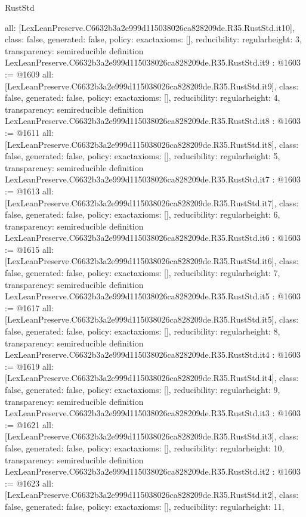 \begin{lexlean}{RustStd}
\begin{coremodule}
{  all: [LexLeanPreserve.C6632b3a2e999d115038026ca828209de.R35.RustStd.it10],
  class: false,
  generated: false,
  policy: exact{axioms: []},
  reducibility: regular{height: 3},
  transparency: semireducible
}
definition LexLeanPreserve.C6632b3a2e999d115038026ca828209de.R35.RustStd.it9 : @1603 := @1609 {
  all: [LexLeanPreserve.C6632b3a2e999d115038026ca828209de.R35.RustStd.it9],
  class: false,
  generated: false,
  policy: exact{axioms: []},
  reducibility: regular{height: 4},
  transparency: semireducible
}
definition LexLeanPreserve.C6632b3a2e999d115038026ca828209de.R35.RustStd.it8 : @1603 := @1611 {
  all: [LexLeanPreserve.C6632b3a2e999d115038026ca828209de.R35.RustStd.it8],
  class: false,
  generated: false,
  policy: exact{axioms: []},
  reducibility: regular{height: 5},
  transparency: semireducible
}
definition LexLeanPreserve.C6632b3a2e999d115038026ca828209de.R35.RustStd.it7 : @1603 := @1613 {
  all: [LexLeanPreserve.C6632b3a2e999d115038026ca828209de.R35.RustStd.it7],
  class: false,
  generated: false,
  policy: exact{axioms: []},
  reducibility: regular{height: 6},
  transparency: semireducible
}
definition LexLeanPreserve.C6632b3a2e999d115038026ca828209de.R35.RustStd.it6 : @1603 := @1615 {
  all: [LexLeanPreserve.C6632b3a2e999d115038026ca828209de.R35.RustStd.it6],
  class: false,
  generated: false,
  policy: exact{axioms: []},
  reducibility: regular{height: 7},
  transparency: semireducible
}
definition LexLeanPreserve.C6632b3a2e999d115038026ca828209de.R35.RustStd.it5 : @1603 := @1617 {
  all: [LexLeanPreserve.C6632b3a2e999d115038026ca828209de.R35.RustStd.it5],
  class: false,
  generated: false,
  policy: exact{axioms: []},
  reducibility: regular{height: 8},
  transparency: semireducible
}
definition LexLeanPreserve.C6632b3a2e999d115038026ca828209de.R35.RustStd.it4 : @1603 := @1619 {
  all: [LexLeanPreserve.C6632b3a2e999d115038026ca828209de.R35.RustStd.it4],
  class: false,
  generated: false,
  policy: exact{axioms: []},
  reducibility: regular{height: 9},
  transparency: semireducible
}
definition LexLeanPreserve.C6632b3a2e999d115038026ca828209de.R35.RustStd.it3 : @1603 := @1621 {
  all: [LexLeanPreserve.C6632b3a2e999d115038026ca828209de.R35.RustStd.it3],
  class: false,
  generated: false,
  policy: exact{axioms: []},
  reducibility: regular{height: 10},
  transparency: semireducible
}
definition LexLeanPreserve.C6632b3a2e999d115038026ca828209de.R35.RustStd.it2 : @1603 := @1623 {
  all: [LexLeanPreserve.C6632b3a2e999d115038026ca828209de.R35.RustStd.it2],
  class: false,
  generated: false,
  policy: exact{axioms: []},
  reducibility: regular{height: 11},
}
\end{coremodule}
\end{lexlean}
